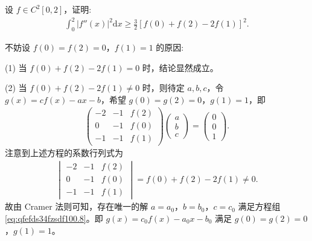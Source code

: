 \documentclass[../../main.tex]{subfiles}%
\begin{document}
\begin{example}
设 \(f \in C^2[0,2]\)，证明:
\begin{align*}
\int_{0}^{2} |f''(x)|^2 \mathrm{d}x \geqslant \frac{3}{2} [f(0) + f(2) - 2f(1)]^2.
\end{align*} 
\end{example}
\begin{remark}
不妨设 \(f(0) = f(2) = 0\)，\(f(1) = 1\) 的原因:

(1) 当 \(f(0) + f(2) - 2f(1) = 0\) 时，结论显然成立。  

(2) 当 \(f(0) + f(2) - 2f(1) \ne 0\) 时，则待定 \(a, b, c\)，令 \(g(x) = c f(x) - a x - b\)，希望 \(g(0) = g(2) = 0\)，\(g(1) = 1\)，即
\begin{align}
\begin{pmatrix}
-2 & -1 & f(2) \\
0 & -1 & f(0) \\
-1 & -1 & f(1)
\end{pmatrix}
\begin{pmatrix}
a \\
b \\
c
\end{pmatrix}
=
\begin{pmatrix}
0 \\
0 \\
1
\end{pmatrix}. \label{eq:qfefds34fzsdf100.8}
\end{align}
注意到上述方程的系数行列式为
\begin{align*}
\begin{vmatrix}
-2 & -1 & f(2) \\
0 & -1 & f(0) \\
-1 & -1 & f(1)
\end{vmatrix}
= f(0) + f(2) - 2f(1) \ne 0.
\end{align*}
故由 Cramer 法则可知，存在唯一的解 \(a = a_0\)，\(b = b_0\)，\(c = c_0\) 满足方程组 \eqref{eq:qfefds34fzsdf100.8}。即 \(g(x) = c_0 f(x) - a_0 x - b_0\) 满足 \(g(0) = g(2) = 0\)，\(g(1) = 1\)。


\end{remark}
\end{document}
